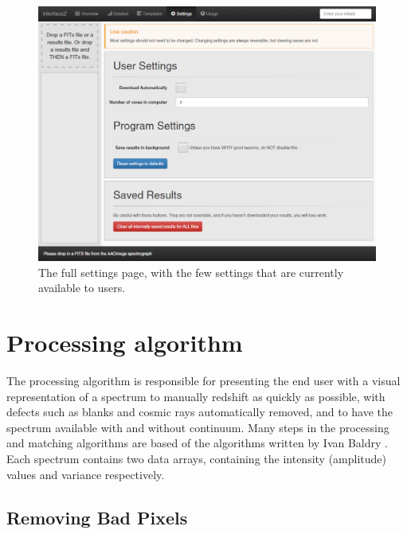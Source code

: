 \documentclass[titlesmallcaps, examinerscopy, copyrightpage]{uqthesis}
\begin{document}
\begin{figure}[ht!]
\includegraphics[width=1\textwidth]{images/settings.png} 
\centering
\caption{The full settings page, with the few settings that are currently available to users.}
\label{fig:settings}
\end{figure}


























\pagebreak
\section{Processing algorithm}

The processing algorithm is responsible for presenting the end user with a visual representation of a spectrum to manually redshift as quickly as possible, with defects such as blanks and cosmic rays automatically removed, and to have the spectrum available with and without continuum. Many steps in the processing and matching algorithms are based of the algorithms written by Ivan Baldry \cite{baldry2014galaxy}. Each spectrum contains two data arrays, containing the intensity (amplitude) values and variance respectively.

\subsection{Removing Bad Pixels}
\end{document}
